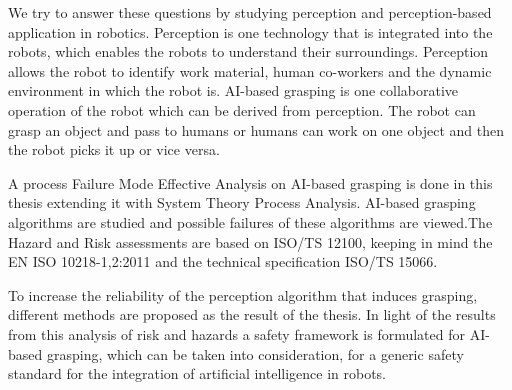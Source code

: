 We try to answer these questions by studying perception and perception-based application in robotics.
Perception is one technology that is integrated into the robots, which enables the robots to understand their surroundings. Perception allows the robot to identify work material, human co-workers and the dynamic environment in which the robot is. AI-based grasping is one collaborative operation of the robot which can be derived from perception. The robot can grasp an object and pass to humans or humans can work on one object and then the robot picks it up or vice versa.

A process Failure Mode Effective Analysis on AI-based grasping is done in this thesis extending it with System Theory Process Analysis. AI-based grasping algorithms are studied and possible failures of these algorithms are viewed.The Hazard and Risk assessments are based on ISO/TS 12100, keeping in mind the EN ISO 10218-1,2:2011 and the technical specification ISO/TS 15066. 

To increase the reliability of the perception algorithm that induces grasping, different methods are proposed as the result of the thesis. In light of the results from this analysis of risk and hazards a safety framework is formulated for AI-based grasping, which can be taken into consideration, for a generic safety standard for the integration of artificial intelligence in robots.
